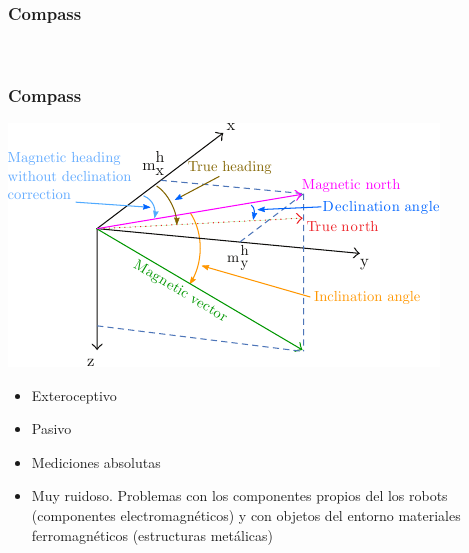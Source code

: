 \begin{frame}
    \frametitle{Compass}
    \begin{figure}[!h]
        \centering
        \\
    \end{figure}
\end{frame}


\begin{frame}
    \frametitle{Compass}

    \begin{center}
        \includegraphics[width=0.5\columnwidth]{images/magnetic_field.pdf}
    \end{center}

    \begin{itemize}
        \item Exteroceptivo
        \item Pasivo
        \item Mediciones absolutas
        \item Muy ruidoso. Problemas con los componentes propios del los robots (componentes electromagnéticos) y con objetos del entorno materiales ferromagnéticos (estructuras metálicas)
    \end{itemize}
\end{frame}

